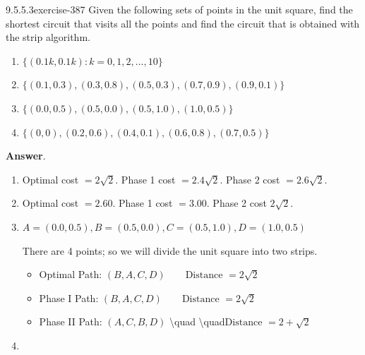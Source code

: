 \documentclass[twoside,10pt,]{book}
\numberwithin{equation}{section}
\begin{document}
\begin{divisionsolution}{9.5.5.3}{}{exercise-387}%
\hypertarget{p-3377}{}%
Given the following sets of points in the unit square, find the shortest circuit that visits all the points and find the circuit that is obtained with the strip algorithm.%
\par
\hypertarget{p-3378}{}%
\leavevmode%
\begin{enumerate}[label=(\alph*)]
\item\hypertarget{li-1583}{}\hypertarget{p-3379}{}%
\(\{(0.1k, 0.1k) : k = 0, 1, 2, . . . , 10\}\)%
\item\hypertarget{li-1584}{}\hypertarget{p-3380}{}%
\(\{(0.1, 0.3), (0.3, 0.8), (0.5, 0.3), (0.7, 0.9), (0.9, 0.1)\}\)%
\item\hypertarget{li-1585}{}\hypertarget{p-3381}{}%
\(\{(0.0, 0.5), (0.5, 0.0), (0.5, 1.0), (1.0, 0.5)\}\)%
\item\hypertarget{li-1586}{}\hypertarget{p-3382}{}%
\(\{(0, 0), (0.2, 0.6), (0.4, 0.1), (0.6, 0.8), (0.7, 0.5)\}\)%
\end{enumerate}
%
\par\smallskip%
\noindent\textbf{Answer}.\quad%
\hypertarget{p-3383}{}%
\leavevmode%
\begin{enumerate}[label=(\alph*)]
\item\hypertarget{li-1587}{}\hypertarget{p-3384}{}%
Optimal cost \(=2\sqrt{2}\). Phase 1 cost \(=2.4\sqrt{2}\). Phase 2 cost \(=2.6\sqrt{2}\).%
\item\hypertarget{li-1588}{}\hypertarget{p-3385}{}%
Optimal cost \(=2.60.\) Phase 1 cost \(=3.00\). Phase 2 cost \(2\sqrt{2}\).%
\item\hypertarget{li-1589}{}\hypertarget{p-3386}{}%
\(A=(0.0, 0.5), B=(0.5, 0.0), C=(0.5, 1.0), D=(1.0, 0.5)\)%
\par
\hypertarget{p-3387}{}%
There are 4 points; so we will divide the unit square into two strips.%
\begin{itemize}[label=\textbullet]
\item{}\hypertarget{p-3388}{}%
Optimal Path: \((B,A,C,D)\quad \quad \text{Distance } =2\sqrt{2}\)%
\item{}\hypertarget{p-3389}{}%
Phase I Path: \((B,A,C,D)\quad \quad \text{Distance }=2\sqrt{2}\)%
\item{}\hypertarget{p-3390}{}%
Phase II Path: \((A,C,B,D)\) \textbackslash{}quad \textbackslash{}quad\(\textrm{Distance }=2+\sqrt{2}\)%
\end{itemize}
%
\item\hypertarget{li-1593}{}\hypertarget{p-3391}{}%

\end{enumerate}
\end{divisionsolution}
\end{document}
